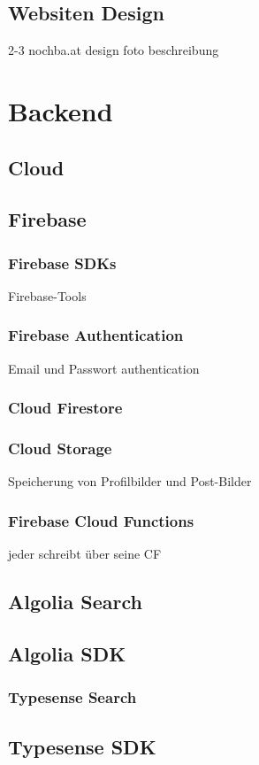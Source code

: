 \subsection{Websiten Design}
2-3 nochba.at design foto
beschreibung

\section{Backend}
\subsection{Cloud}
\author{Martin Hausleitner}

\subsection{Firebase}
\author{Martin Hausleitner}

\subsubsection{Firebase SDKs}
Firebase-Tools

\subsubsection{Firebase Authentication}
Email und Passwort authentication

\subsubsection{Cloud Firestore}
\subsubsection{Cloud Storage}
Speicherung von Profilbilder und Post-Bilder
\subsubsection{Firebase Cloud Functions}
jeder schreibt über seine CF

\subsection{Algolia Search}
\subsection{Algolia SDK}

\subsubsection{Typesense Search}
\subsection{Typesense SDK}
